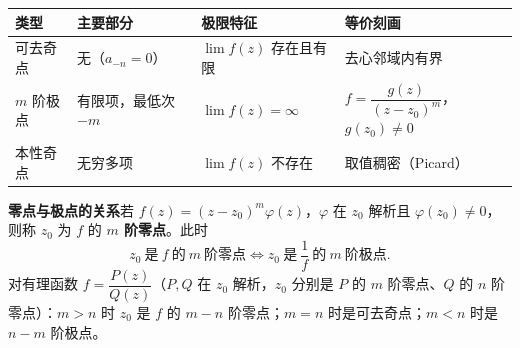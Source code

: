 \begin{center}
\begin{tabular}{llll}
\toprule
类型 & 主要部分 & 极限特征 & 等价刻画 \\
\midrule
可去奇点 & 无（\(a_{-n}=0\)） & \(\lim f(z)\) 存在且有限 & 去心邻域内有界 \\
\(m\) 阶极点 & 有限项，最低次 \(-m\) & \(\lim f(z)=\infty\) & \(f=\dfrac{g(z)}{(z-z_{0})^{m}}\)，\(g(z_{0})\neq0\) \\
本性奇点 & 无穷多项 & \(\lim f(z)\) 不存在 & 取值稠密（Picard） \\
\bottomrule
\end{tabular}
\end{center}

\textbf{零点与极点的关系}\quad 若 \(f(z)=(z-z_{0})^{m}\varphi(z)\)，\(\varphi\) 在 \(z_{0}\) 解析且 \(\varphi(z_{0})\neq0\)，则称 \(z_{0}\) 为 \(f\) 的 \textbf{\(m\) 阶零点}。此时
\[
z_{0}\ \text{是}\ f\ \text{的}\ m\ \text{阶零点}\iff z_{0}\ \text{是}\ \frac{1}{f}\ \text{的}\ m\ \text{阶极点}.
\]
对有理函数 \(f=\dfrac{P(z)}{Q(z)}\)（\(P,Q\) 在 \(z_{0}\) 解析，\(z_{0}\) 分别是 \(P\) 的 \(m\) 阶零点、\(Q\) 的 \(n\) 阶零点）：\(m>n\) 时 \(z_{0}\) 是 \(f\) 的 \(m-n\) 阶零点；\(m=n\) 时是可去奇点；\(m<n\) 时是 \(n-m\) 阶极点。

